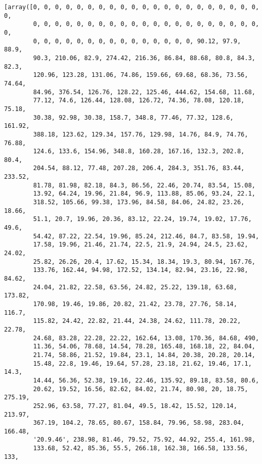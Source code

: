 \documentclass[11pt]{article}
\makeatletter
\newcommand{\boxspacing}{\kern\kvtcb@left@rule\kern\kvtcb@boxsep}
\newcommand{\prompt}[4]{
        \ttfamily\llap{{\color{#2}[#3]:\hspace{3pt}#4}}\vspace{-\baselineskip}
    }
\makeatother
\begin{document}
            \begin{tcolorbox}[breakable, size=fbox, boxrule=.5pt, pad at break*=1mm, opacityfill=0]
\prompt{Out}{outcolor}{0}{\boxspacing}
\begin{Verbatim}[commandchars=\\\{\}]
[array([0, 0, 0, 0, 0, 0, 0, 0, 0, 0, 0, 0, 0, 0, 0, 0, 0, 0, 0, 0, 0, 0,
        0, 0, 0, 0, 0, 0, 0, 0, 0, 0, 0, 0, 0, 0, 0, 0, 0, 0, 0, 0, 0, 0,
        0, 0, 0, 0, 0, 0, 0, 0, 0, 0, 0, 0, 0, 0, 0, 90.12, 97.9, 88.9,
        90.3, 210.06, 82.9, 274.42, 216.36, 86.84, 88.68, 80.8, 84.3, 82.3,
        120.96, 123.28, 131.06, 74.86, 159.66, 69.68, 68.36, 73.56, 74.64,
        84.96, 376.54, 126.76, 128.22, 125.46, 444.62, 154.68, 11.68,
        77.12, 74.6, 126.44, 128.08, 126.72, 74.36, 78.08, 120.18, 75.18,
        30.38, 92.98, 30.38, 158.7, 348.8, 77.46, 77.32, 128.6, 161.92,
        388.18, 123.62, 129.34, 157.76, 129.98, 14.76, 84.9, 74.76, 76.88,
        124.6, 133.6, 154.96, 348.8, 160.28, 167.16, 132.3, 202.8, 80.4,
        204.54, 88.12, 77.48, 207.28, 206.4, 284.3, 351.76, 83.44, 233.52,
        81.78, 81.98, 82.18, 84.3, 86.56, 22.46, 20.74, 83.54, 15.08,
        13.92, 64.24, 19.96, 21.84, 96.9, 113.88, 85.06, 93.24, 22.1,
        318.52, 105.66, 99.38, 173.96, 84.58, 84.06, 24.82, 23.26, 18.66,
        51.1, 20.7, 19.96, 20.36, 83.12, 22.24, 19.74, 19.02, 17.76, 49.6,
        54.42, 87.22, 22.54, 19.96, 85.24, 212.46, 84.7, 83.58, 19.94,
        17.58, 19.96, 21.46, 21.74, 22.5, 21.9, 24.94, 24.5, 23.62, 24.02,
        25.82, 26.26, 20.4, 17.62, 15.34, 18.34, 19.3, 80.94, 167.76,
        133.76, 162.44, 94.98, 172.52, 134.14, 82.94, 23.16, 22.98, 84.62,
        24.04, 21.82, 22.58, 63.56, 24.82, 25.22, 139.18, 63.68, 173.82,
        170.98, 19.46, 19.86, 20.82, 21.42, 23.78, 27.76, 58.14, 116.7,
        115.82, 24.42, 22.82, 21.44, 24.38, 24.62, 111.78, 20.22, 22.78,
        24.68, 83.28, 22.28, 22.22, 162.64, 13.08, 170.36, 84.68, 490,
        11.36, 54.06, 78.68, 14.54, 78.28, 165.48, 168.18, 22, 84.04,
        21.74, 58.86, 21.52, 19.84, 23.1, 14.84, 20.38, 20.28, 20.14,
        15.48, 22.8, 19.46, 19.64, 57.28, 23.18, 21.62, 19.46, 17.1, 14.3,
        14.44, 56.36, 52.38, 19.16, 22.46, 135.92, 89.18, 83.58, 80.6,
        20.62, 19.52, 16.56, 82.62, 84.02, 21.74, 80.98, 20, 18.75, 275.19,
        252.96, 63.58, 77.27, 81.04, 49.5, 18.42, 15.52, 120.14, 213.97,
        367.19, 104.2, 78.65, 80.67, 158.84, 79.96, 58.98, 283.04, 166.48,
        '20.9.46', 238.98, 81.46, 79.52, 75.92, 44.92, 255.4, 161.98,
        133.68, 52.42, 85.36, 55.5, 266.18, 162.38, 166.58, 133.56, 133,

\end{Verbatim}
\end{tcolorbox}
\end{document}
